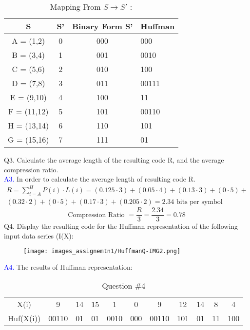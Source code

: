 \documentclass[letterpaper, 12pt]{article}
\begin{document}
\begin{table}[htbp]
\centering
\caption{Mapping From $S \rightarrow S'$ :}
\begin{tabular}{|c|c|c|l|}
\hline
S & S' & Binary Form S' & Huffman \\
\hline
A = (1,2) & 0 & 000 & 000\\
\hline
B = (3,4) & 1 & 001 & 0010\\
\hline
C = (5,6) & 2 & 010 & 100\\
\hline
D = (7,8) & 3 & 011 & 00111\\
\hline
E = (9,10) & 4 & 100 & 11\\
\hline
F = (11,12) & 5 & 101 & 00110\\
\hline
H = (13,14) & 6 & 110 & 101\\
\hline
G = (15,16) & 7 & 111 & 01\\
\hline
\end{tabular}
\end{table}

Q3. Calculate the average length of the resulting code R, and the average compression ratio. \\
\textcolor{blue}{A3.} In order to calculate the average length of resulting code R.
\begin{align*}
    R = \sum_{i=A}^{H} P(i) \cdot L(i) = (0.125 \cdot 3) + (0.05 \cdot 4) + (0.13 \cdot 3) + (0 \cdot 5)  + \\ (0.32 \cdot 2 ) + (0 \cdot 5) + (0.17 \cdot 3) + (0.205 \cdot 2) = 2.34 \text{ bits per symbol}
\end{align*}
\[\text{Compression Ratio } = \frac{R}{3} = \frac{2.34}{3} =0.78 \]
Q4. Display the resulting code for the Huffman representation of the following input data series (I(X):\\
\begin{figure}[htbp]
    \centering
    \texttt{[image: images\_assignemtn1/HuffmanQ-IMG2.png]}
    \label{fig:enter-label}
\end{figure}

\textcolor{blue}{A4.} The results of Huffman representation:
\begin{table}[htbp]
    \centering
    \begin{tabular}{c|c|c|c|c|c|c|c|c|c|c}
         X(i)&  9&  14&  15&  1&  0&  9&  12&  14& 8 &4\\
         Huf(X(i))&  00110&  01&  01&  0010&  000&  00110&  101&  01&  11&100\\
    \end{tabular}
    \caption{Question \#4}
    \label{tab:my_label}
\end{table}
\end{document}
